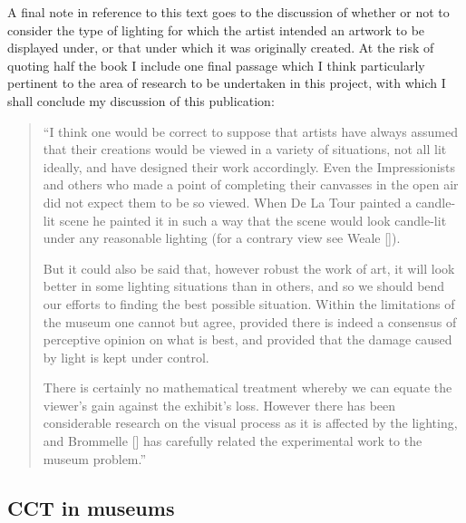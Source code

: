 A final note in reference to this text goes to the discussion of whether or not to consider the type of lighting for which the artist intended an artwork to be displayed under, or that under which it was originally created. At the risk of quoting half the book I include one final passage which I think particularly pertinent to the area of research to be undertaken in this project, with which I shall conclude my discussion of this publication:

\begin{quote}
``I think one would be correct to suppose that artists have always assumed that their creations would be viewed in a variety of situations, not all lit ideally, and have designed their work accordingly. Even the Impressionists and others who made a point of completing their canvasses in the open air did not expect them to be so viewed. When De La Tour painted a candle-lit scene he painted it in such a way that the scene would look candle-lit under any reasonable lighting (for a contrary view see Weale [\citep{weale_truth_1973}]). 

But it could also be said that, however robust the work of art, it will look better in some lighting situations than in others, and so we should bend our efforts to finding the best possible situation. Within the limitations of the museum one cannot but agree, provided there is indeed a consensus of perceptive opinion on what is best, and provided that the damage caused by light is kept under control. 

There is certainly no mathematical treatment whereby we can equate the viewer's gain against the exhibit's loss. However there has been considerable research on the visual process as it is affected by the lighting, and Brommelle [\citep{brommelle_visual_1972}] has carefully related the experimental work to the museum problem.'' %
\end{quote}





















\subsection{CCT in museums}
\label{sec:CCTmus}

